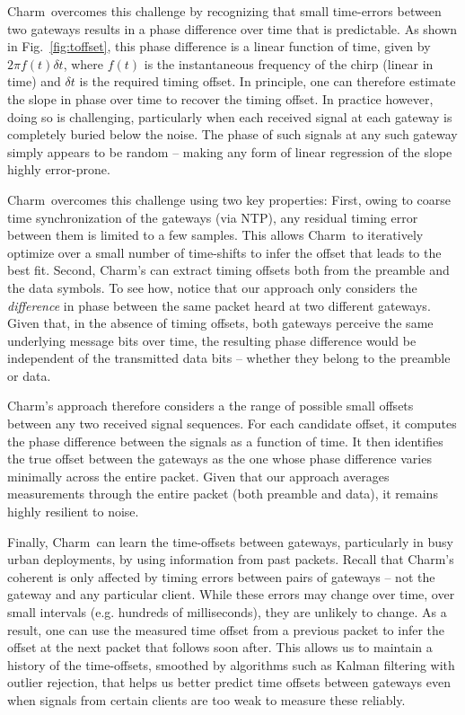  Charm\ overcomes this challenge by recognizing that small time-errors between two gateways results in a phase difference over time that is predictable. As shown in Fig.~\ref{fig:toffset}, this phase difference is a linear function of time, given by $2\pi f(t) \delta t$, where $f(t)$ is the instantaneous frequency of the chirp (linear in time) and $\delta t$ is the required timing offset. In principle, one can therefore estimate the slope in phase over time to recover the timing offset. In practice however, doing so is challenging, particularly when each received signal at each gateway is completely buried below the noise. The phase of such signals at any such gateway simply appears to be random -- making any form of linear regression of the slope highly error-prone.

Charm\ overcomes this challenge using two key properties: First, owing to coarse time synchronization of the gateways (via NTP), any residual timing error between them is limited to a few samples. This allows Charm\ to iteratively optimize over a small number of time-shifts to infer the offset that leads to the best fit. Second, Charm's can extract timing offsets both from the preamble and the data symbols. To see how, notice that our approach only considers the {\it difference} in phase between the same packet heard at two different gateways. Given that, in the absence of timing offsets, both gateways perceive the same underlying message bits over time, the resulting phase difference would be independent of the transmitted data bits -- whether they belong to the preamble or data. 

Charm's approach therefore considers a the range of possible small offsets between any two received signal sequences. For each candidate offset, it computes the phase difference between the signals as a function of time. It then identifies the true offset between the gateways as the one whose phase difference varies minimally across the entire packet. Given that our approach averages measurements through the entire packet (both preamble and data), it remains highly resilient to noise.\vspace*{0.1in}


 Finally, Charm\ can learn the time-offsets between gateways, particularly in busy urban deployments, by using information from past packets. Recall that Charm's coherent is only affected by timing errors between pairs of gateways -- not the gateway and any particular client. While these errors may change over time, over small intervals (e.g. hundreds of milliseconds), they are unlikely to change. As a result, one can use the measured time offset from a previous packet to infer the offset at the next packet that follows soon after. This allows us to maintain a history of the time-offsets, smoothed by algorithms such as Kalman filtering with outlier rejection, that helps us better predict time offsets between gateways even when signals from certain clients are too weak to measure these reliably. 



